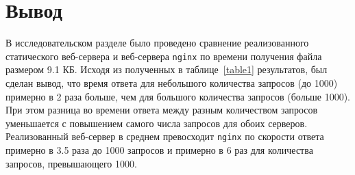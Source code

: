 \section*{Вывод}

В исследовательском разделе было проведено сравнение реализованного статического веб-сервера и веб-сервера \texttt{nginx} по времени получения файла размером 9.1 КБ.
Исходя из полученных в таблице~\ref{table1} результатов, был сделан вывод, что время ответа для небольшого количества запросов (до 1000) примерно в 2 раза больше, чем для большого количества запросов (больше 1000).
При этом разница во времени ответа между разным количеством запросов уменьшается с повышением самого числа запросов для обоих серверов.
Реализованный веб-сервер в среднем превосходит \texttt{nginx} по скорости ответа примерно в 3.5 раза до 1000 запросов и примерно в 6 раз для количества запросов, превышающего 1000.